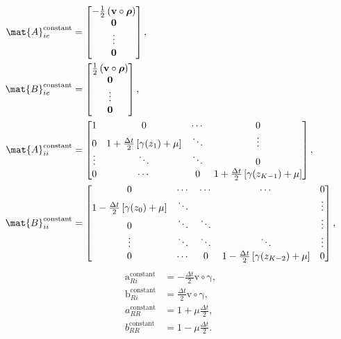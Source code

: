 \documentclass{jpmarticle}
\renewcommand{\vec}[1]{\boldsymbol{\mathrm{#1}}}
\begin{document}
\begin{equation}
  \begin{split}
    \mat{A}_{ie}^{\text{constant}} &=
    \begin{bmatrix}
      - \frac{1}{2} \left(\vec{v} \circ \vec{\rho}\right)
      \\
      \vec{0}
      \\
      \vdots
      \\
      \vec{0}
    \end{bmatrix},
    \\
    \mat{B}_{ie}^{\text{constant}} &=
    \begin{bmatrix}
      \frac{1}{2} \left(\vec{v} \circ \vec{\rho}\right)
      \\
      \vec{0}
      \\
      \vdots
      \\
      \vec{0}
    \end{bmatrix},
    \\
    \mat{A}_{ii}^{\text{constant}} &=
    \begin{bmatrix}
      1 & 0 & \cdots & 0
      \\
      0 & 1 + \frac{\Delta t}{2} \left[\gamma(z_1) + \mu\right] &
      \ddots & \vdots
      \\
      \vdots & \ddots & \ddots & 0
      \\
      0 & \cdots & 0 &
      1 + \frac{\Delta t}{2} \left[\gamma(z_{K - 1}) + \mu\right]
    \end{bmatrix},
    \\
    \mat{B}_{ii}^{\text{constant}} &=
    \begin{bmatrix}
      0 & \cdots & \cdots & \cdots & 0
      \\
      1 - \frac{\Delta t}{2} \left[\gamma(z_0) + \mu\right] & \ddots &
      & & \vdots
      \\
      0 & \ddots & \ddots & & \vdots
      \\
      \vdots & \ddots & \ddots & \ddots & \vdots
      \\
      0 & \cdots & 0 &
      1 - \frac{\Delta t}{2} \left[\gamma(z_{K - 2}) + \mu\right] & 0
    \end{bmatrix},
  \end{split}
\end{equation}
\begin{equation}
  \begin{split}
    \vec{a}_{Ri}^{\text{constant}} &=
    - \frac{\Delta t}{2} \vec{v} \circ \vec{\gamma},
    \\
    \vec{b}_{Ri}^{\text{constant}} &=
    \frac{\Delta t}{2} \vec{v} \circ \vec{\gamma},
    \\
    a_{RR}^{\text{constant}} &=
    1 + \mu \frac{\Delta t}{2},
    \\
    b_{RR}^{\text{constant}} &=
    1 - \mu \frac{\Delta t}{2}.
  \end{split}
\end{equation}
\end{document}
